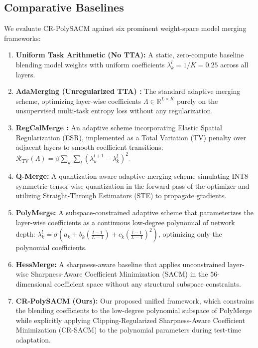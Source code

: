 \subsection{Comparative Baselines}
We evaluate CR-PolySACM against six prominent weight-space model merging frameworks:
\begin{enumerate}
    \item \textbf{Uniform Task Arithmetic (No TTA):} A static, zero-compute baseline blending model weights with uniform coefficients $\lambda_k^l = 1/K = 0.25$ across all layers.
    \item \textbf{AdaMerging (Unregularized TTA) \cite{adamerging}:} The standard adaptive merging scheme, optimizing layer-wise coefficients $\Lambda \in \mathbb{R}^{L \times K}$ purely on the unsupervised multi-task entropy loss without any regularization.
    \item \textbf{RegCalMerge \cite{zipmerge}:} An adaptive scheme incorporating Elastic Spatial Regularization (ESR), implemented as a Total Variation (TV) penalty over adjacent layers to smooth coefficient transitions: $\mathcal{R}_{\text{TV}}(\Lambda) = \beta \sum_k \sum_l (\lambda_k^{l+1} - \lambda_k^l)^2$.
    \item \textbf{Q-Merge:} A quantization-aware adaptive merging scheme simulating INT8 symmetric tensor-wise quantization in the forward pass of the optimizer and utilizing Straight-Through Estimators (STE) to propagate gradients.
    \item \textbf{PolyMerge:} A subspace-constrained adaptive scheme that parameterizes the layer-wise coefficients as a continuous low-degree polynomial of network depth: $\lambda_k^l = \sigma\left(a_k + b_k \left(\frac{l-1}{L-1}\right) + c_k \left(\frac{l-1}{L-1}\right)^2\right)$, optimizing only the polynomial coefficients.
    \item \textbf{HessMerge:} A sharpness-aware baseline that applies unconstrained layer-wise Sharpness-Aware Coefficient Minimization (SACM) in the $56$-dimensional coefficient space without any structural subspace constraints.
    \item \textbf{CR-PolySACM (Ours):} Our proposed unified framework, which constrains the blending coefficients to the low-degree polynomial subspace of PolyMerge while explicitly applying Clipping-Regularized Sharpness-Aware Coefficient Minimization (CR-SACM) to the polynomial parameters during test-time adaptation.
\end{enumerate}

